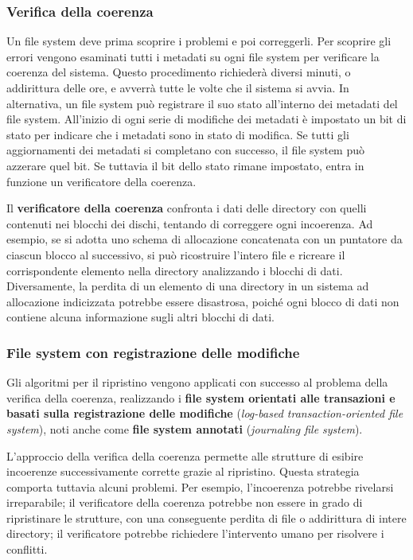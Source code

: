 \documentclass[11pt,a4paper]{article}
\begin{document}
{\subsubsection{Verifica della coerenza}
Un file system deve prima scoprire i problemi e poi cor­reggerli. Per scoprire gli errori vengono esaminati tutti i metadati su ogni file system per ve­rificare la coerenza del sistema.
Questo procedimento richiederà diversi
minuti, o addirittura delle ore, e avverrà tutte le volte che il sistema si avvia. In alternativa,
un file system può registrare il suo stato all'interno dei metadati del file system. All'inizio di
ogni serie di modifiche dei metadati è impostato un bit di stato per indicare che i metadati
sono in stato di modifica. Se tutti gli aggiornamenti dei metadati si completano con succes­so, il file system può azzerare quel bit. Se tuttavia il bit dello stato rimane impostato, entra
in funzione un verificatore della coerenza.

Il \textbf{verificatore della coerenza} confronta i dati delle directory con quelli contenuti nei blocchi dei
dischi, tentando di correggere ogni incoerenza.
Ad esempio, se si adotta uno schema di al­locazione concatenata con un puntatore da ciascun blocco al successivo, si può ricostruire
l'intero file e ricreare il corrispondente elemento nella directory analizzando i blocchi di dati. Diversamente, la perdita di un elemento di una directory in un sistema ad allocazione in­dicizzata potrebbe essere disastrosa, poiché ogni blocco di dati non contiene alcuna infor­mazione sugli altri blocchi di dati.

\subsubsection{File system con registrazione delle modifiche}
Gli algoritmi per il ripristino vengono applicati con successo al problema della verifica
della coerenza, realizzando i \textbf{file system orientati alle transazioni e basati sulla registrazio­ne delle modifiche} (\emph{log-based transaction-oriented file system}), noti anche come \textbf{file system
annotati} (\emph{journaling file system}).

L'approccio della verifica della coerenza permette alle strutture di esibire incoerenze successivamente corrette grazie al ripri­stino. Questa strategia comporta tuttavia alcuni problemi.
Per esempio, l'incoerenza potrebbe rivelarsi irreparabile; il verificatore della coerenza potrebbe non essere in grado di
ripristinare le strutture, con una conseguente perdita di file o addirittura di intere directory; il verificatore potrebbe richiedere l'intervento umano per risolvere i
conflitti.

}
\end{document}
